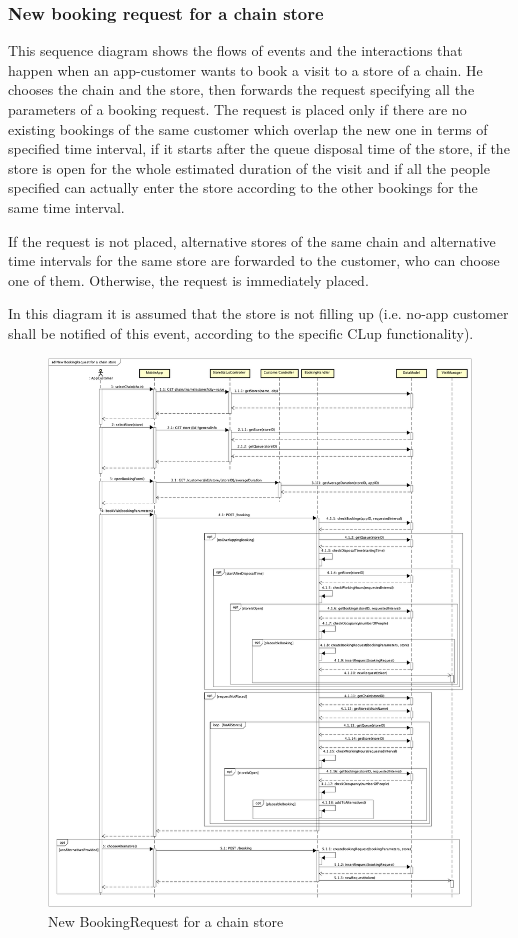 \documentclass[a4paper,oneside,11pt]{book}
\begin{document}
    \subsubsection{New booking request for a chain store}
    This sequence diagram shows the flows of events and the interactions that happen when an app-customer wants to book a visit to a store of a chain. He chooses the chain and the store, then forwards the request specifying all the parameters of a booking request. The request is placed only if there are no existing bookings of the same customer which overlap the new one in terms of specified time interval, if it starts after the queue disposal time of the store, if the store is open for the whole estimated duration of the visit and if all the people specified can actually enter the store according to the other bookings for the same time interval. \par
    If the request is not placed, alternative stores of the same chain and alternative time intervals for the same store are forwarded to the customer, who can choose one of them. Otherwise, the request is immediately placed. \par
    In this diagram it is assumed that the store is not filling up (i.e. no-app customer shall be notified of this event, according to the specific CLup functionality).
    \begin{figure}[H]
        \centering
        \includegraphics[width=.95\textwidth, height=\textheight, keepaspectratio]{pictures/sequence_diagrams/new_booking_request_for_a_chain_store}
        \caption{New BookingRequest for a chain store}
        \label{figure:new_bookingrequest_for_a_chain_store}
    \end{figure}
\end{document}
